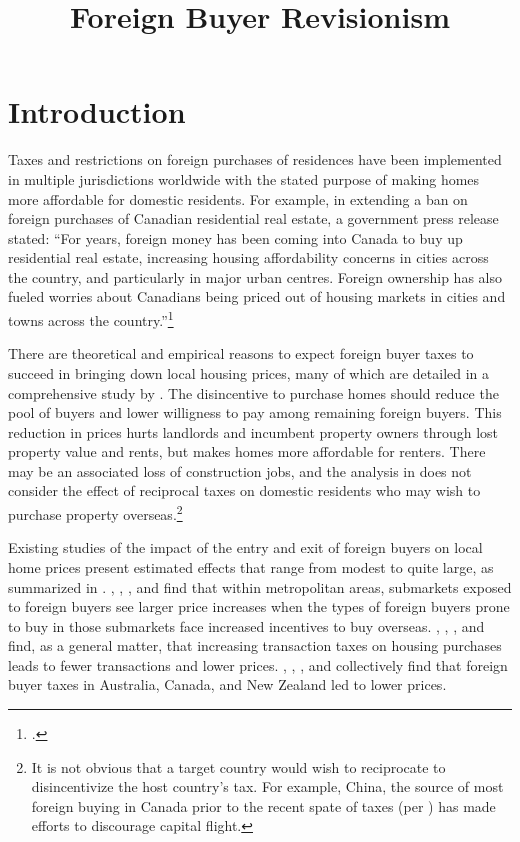 \documentclass[12pt]{article}
\begin{document}
\title{Foreign Buyer Revisionism}

\section{Introduction}

Taxes and restrictions on foreign purchases of residences have been implemented in multiple jurisdictions worldwide with the stated purpose of making homes more affordable for domestic residents. For example, in extending a ban on foreign purchases of Canadian residential real estate, a government press release stated: ``For years, foreign money has been coming into Canada to buy up residential real estate, increasing housing affordability concerns in cities across the country, and particularly in major urban centres. Foreign ownership has also fueled worries about Canadians being priced out of housing markets in cities and towns across the country.''\footnote{\textcite{gOC}.}

There are theoretical and empirical reasons to expect foreign buyer taxes to
succeed in bringing down local housing prices, many of which are detailed in a
comprehensive study by \textcite{favilukisVanNieuwerburgh}. The disincentive to
purchase homes should reduce the pool of buyers and lower willigness to pay
among remaining foreign buyers. This reduction in prices hurts landlords and
incumbent property owners through lost property value and rents, but makes
homes more affordable for renters. There may be an associated loss of
construction jobs, and the analysis in \textcite{favilukisVanNieuwerburgh} does
not consider the effect of reciprocal taxes on domestic residents who may wish
to purchase property overseas.\footnote{It is not obvious that a target country
would wish to reciprocate to disincentivize the host country's tax. For
example, China, the source of most foreign buying in Canada prior to the recent
spate of taxes (per \textcite{ctvNews}) has made efforts to discourage capital
flight.}

Existing studies of the impact of the entry and exit of foreign buyers on local home prices
present estimated effects that range from modest to quite large, as summarized
in \textcite{davidoffZheng}. \textcite{LiShenZhang},
\textcite{gorbackGlobalCapitalLocal2020}, \textcite{pavlovImmigrationFlows},
and \textcite{BadarinzaRamadorai} find that within metropolitan areas,
submarkets exposed to foreign buyers see larger price increases when the types
of foreign buyers prone to buy in those submarkets face increased incentives to
buy overseas. \textcite{DachisDurantonTurner}, \textcite{klevenBest},
\textcite{kopczukMunroe}, and \textcite{davidoffLeigh} find, as a general
matter, that increasing transaction taxes on housing purchases leads to fewer
transactions and lower prices. \textcite{HartleyForeign},
\textcite{andalfattoEstimatingEffectMetro2023}, \textcite{DuYinZhang}, and
\textcite{pavlovForeignBuyerTaxes} collectively find that foreign buyer taxes
in Australia, Canada, and New Zealand led to lower prices.
\end{document}
